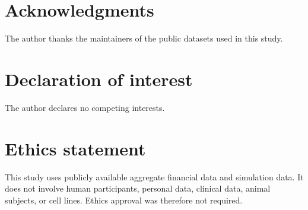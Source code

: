 \documentclass[12pt,a4paper]{article}
\newif\ifblinded
\begin{document}
\section*{Acknowledgments}

\ifblinded
Acknowledgments are omitted from the review manuscript to preserve
double-blind anonymity.
\else
The author thanks the maintainers of the public datasets used in this
study.
\fi

\section*{Declaration of interest}

The author declares no competing interests.

\section*{Ethics statement}

This study uses publicly available aggregate financial data and
simulation data. It does not involve human participants, personal data,
clinical data, animal subjects, or cell lines. Ethics approval was
therefore not required.
\end{document}
